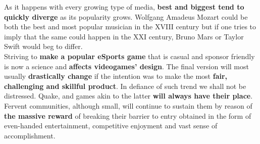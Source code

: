 As it happens with every growing type of media, \textbf{best and biggest tend to quickly diverge} as its popularity grows. Wolfgang Amadeus Mozart could be both the best and most popular musician in the XVIII century but if one tries to imply that the same could happen in the XXI century, Bruno Mars or Taylor Swift would beg to differ.\\

Striving to \textbf{make a popular eSports game} that is casual and sponsor friendly is now a science and \textbf{affects videogames' design}. The final version will most usually \textbf{drastically change} if the intention was to make the most \textbf{fair, challenging and skillful product}. In defiance of such trend we shall not be distressed. Quake, and games akin to the latter \textbf{will always have their place}. Fervent communities, although small, will continue to sustain them by reason of \textbf{the massive reward} of breaking their barrier to entry obtained in the form of even-handed entertainment, competitive enjoyment and vast sense of accomplishment.\\